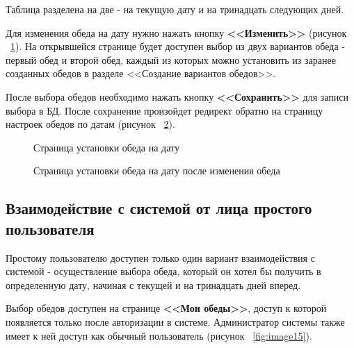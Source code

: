 \documentclass[a4paper]{article}
\begin{document}
Таблица разделена на две - на текущую дату и на тринадцать следующих дней.

Для изменения обеда на дату нужно нажать кнопку \textbf{<<Изменить>>} (рисунок ~\ref{fig:image13}). На открывшейся странице будет доступен выбор из двух вариантов обеда - первый обед и второй обед, каждый из которых можно установить из заранее созданных обедов в разделе <<Создание вариантов обедов>>.

После выбора обедов необходимо нажать кнопку \textbf{<<Сохранить>>} для записи выбора в БД. После сохранение произойдет редирект обратно на страницу настроек обедов по датам (рисунок ~\ref{fig:image14}).

\begin{figure}[h]
\caption{Страница установки обеда на дату}
\label{fig:image13}
\end{figure}

\begin{figure}[h]
\caption{Страница установки обеда на дату после изменения обеда}
\label{fig:image14}
\end{figure}


\subsection{Взаимодействие с системой от лица простого пользователя}

Простому пользователю доступен только один вариант взаимодействия с системой - осуществление выбора обеда, который он хотел бы получить в определенную дату, начиная с текущей и на тринадцать дней вперед.

Выбор обедов доступен на странице \textbf{<<Мои обеды>>}, доступ к которой появляется только после авторизации в системе. Администратор системы также имеет к ней доступ как обычный пользователь (рисунок ~\ref{fig:image15}).
\end{document}
